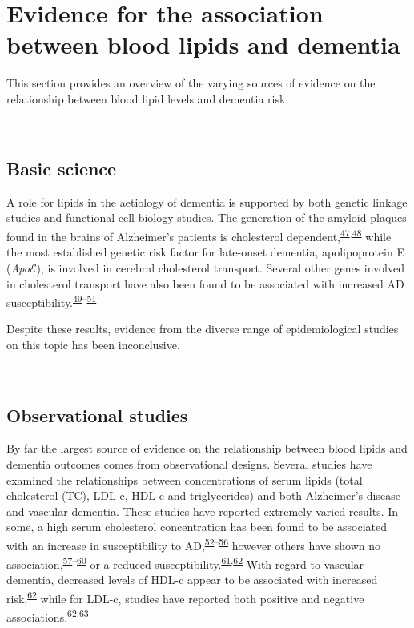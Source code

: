\documentclass[a4paper, twoside]{templates/ociamthesis}
\begin{document}
~

\hypertarget{evidence-association}{%
\section{Evidence for the association between blood lipids and dementia}\label{evidence-association}}

This section provides an overview of the varying sources of evidence on the relationship between blood lipid levels and dementia risk.

~

\hypertarget{intro-basic-science}{%
\subsection{Basic science}\label{intro-basic-science}}

A role for lipids in the aetiology of dementia is supported by both genetic linkage studies and functional cell biology studies. The generation of the amyloid plaques found in the brains of Alzheimer's patients is cholesterol dependent,\textsuperscript{\protect\hyperlink{ref-burns2003}{47},\protect\hyperlink{ref-mizuno1999}{48}} while the most established genetic risk factor for late-onset dementia, apolipoprotein E (\emph{Apo}\(\mathcal{E}\)), is involved in cerebral cholesterol transport. Several other genes involved in cholesterol transport have also been found to be associated with increased AD susceptibility.\textsuperscript{\protect\hyperlink{ref-beecham2014}{49}--\protect\hyperlink{ref-meng2007}{51}}

Despite these results, evidence from the diverse range of epidemiological studies on this topic has been inconclusive.

~

\hypertarget{observational-studies}{%
\subsection{Observational studies}\label{observational-studies}}

By far the largest source of evidence on the relationship between blood lipids and dementia outcomes comes from observational designs. Several studies have examined the relationships between concentrations of serum lipids (total cholesterol (TC), LDL-c, HDL-c and triglycerides) and both Alzheimer's disease and vascular dementia. These studies have reported extremely varied results. In some, a high serum cholesterol concentration has been found to be associated with an increase in susceptibility to AD,\textsuperscript{\protect\hyperlink{ref-kivipelto2002}{52}--\protect\hyperlink{ref-whitmer2005}{56}} however others have shown no association,\textsuperscript{\protect\hyperlink{ref-li2005}{57}--\protect\hyperlink{ref-tan2003}{60}} or a reduced susceptibility.\textsuperscript{\protect\hyperlink{ref-mielke2005}{61},\protect\hyperlink{ref-reitz2004}{62}} With regard to vascular dementia, decreased levels of HDL-c appear to be associated with increased risk,\textsuperscript{\protect\hyperlink{ref-reitz2004}{62}} while for LDL-c, studies have reported both positive and negative associations.\textsuperscript{\protect\hyperlink{ref-reitz2004}{62},\protect\hyperlink{ref-moroney1999}{63}}
\end{document}
